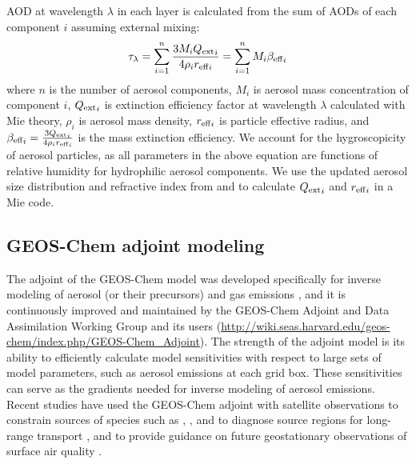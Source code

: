 AOD at wavelength $\lambda$ in each layer is calculated from the sum of AODs 
of each component $i$ assuming external mixing:
\begin{equation}
\tau_\lambda = \sum_{i=1}^n\frac{3M_i{Q_\text{ext}}_i}{4\rho_i{r_\text{eff}}_i}
             = \sum_{i=1}^nM_i{\beta_\text{eff}}_i
\end{equation}
where $n$ is the number of aerosol components, $M_i$ is aerosol mass 
concentration of component $i$, ${Q_\text{ext}}_i$ is extinction efficiency factor 
at wavelength $\lambda$ calculated with Mie theory, $\rho_i$ is aerosol mass
density, ${r_\text{eff}}_i$ is particle effective radius, and 
${\beta_\text{eff}}_i = \frac{3{Q_\text{ext}}_i}{4\rho_i{r_\text{eff}}_i}$ is the mass
extinction efficiency. We account for the hygroscopicity of aerosol 
particles, as all parameters in the above equation are functions of relative
humidity for hydrophilic aerosol components. We use the updated aerosol size
distribution and refractive index from \citet{Drury10} and \citet{Wang10} to
calculate ${Q_\text{ext}}_i$ and ${r_\text{eff}}_i$ in a Mie code.

\subsection{GEOS-Chem adjoint modeling} \label{subsec:gcadj}

 The adjoint of the GEOS-Chem model was developed specifically for inverse 
modeling of aerosol (or their precursors) and gas emissions \citep{Henze07, 
Henze09}, and it is continuously improved and maintained by the GEOS-Chem 
Adjoint and Data Assimilation Working Group and its users 
(\url{http://wiki.seas.harvard.edu/geos-chem/index.php/GEOS-Chem_Adjoint}).
The strength of the adjoint model is its ability to efficiently calculate 
model sensitivities with respect to large sets of model parameters, such as 
aerosol emissions at each grid box. These sensitivities can serve as the 
gradients needed for inverse modeling of aerosol emissions. Recent studies 
have used the GEOS-Chem adjoint with satellite observations to constrain 
sources of species such as  \citep{Kopacz09,Kopacz10,Jiang11}, 
\citep{Wecht12}, and  \citep{Parrington12} to diagnose source regions 
for long-range transport \citep{Henze09,Kopacz11}, and to provide guidance on 
future geostationary observations of surface air quality \citep{Zoogman11}.

